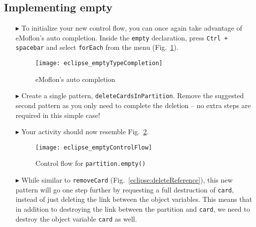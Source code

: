 \newpage
\hypertarget{emptyPartition tex}{}
\subsection{Implementing empty}
\texHeader

\begin{itemize}
 
\item[$\blacktriangleright$] To initialize your new control flow, you can once again take advantage of eMoflon's auto completion. Inside the
\texttt{empty} declaration, press  \texttt{Ctrl + spacebar} and select \texttt{forEach} from the menu (Fig.~\ref{eclipse:typeCompletion}).

\vspace{1cm}

\begin{figure}[htpb]
\begin{center}
  \texttt{[image: eclipse\_emptyTypeCompletion]}
  \caption{eMoflon's auto completion}
  \label{eclipse:typeCompletion}
\end{center}
\end{figure}

\vspace{1cm}

\item[$\blacktriangleright$] Create a single pattern, \texttt{deleteCardsInPartition}. Remove the suggested second pattern as you only need to complete the
deletion -- no extra steps are required in this simple case!

\item[$\blacktriangleright$] Your activity should now resemble Fig.~\ref{eclipse:emptyControlFlow}.

\clearpage

\begin{figure}[htpb]
\begin{center}
  \texttt{[image: eclipse\_emptyControlFlow]}
  \caption{Control flow for \texttt{partition.empty()}}
  \label{eclipse:emptyControlFlow}
\end{center}
\end{figure}

\item[$\blacktriangleright$] While similar to \texttt{removeCard} (Fig.~\ref{eclipse:deleteReference}), this new pattern will go one step further by requesting
a full destruction of \texttt{card}, instead of just deleting the link between the object variables. This means that in addition to destroying the link between
the partition and \texttt{card}, we need to destroy the object variable \texttt{card} as well.


\end{itemize}
